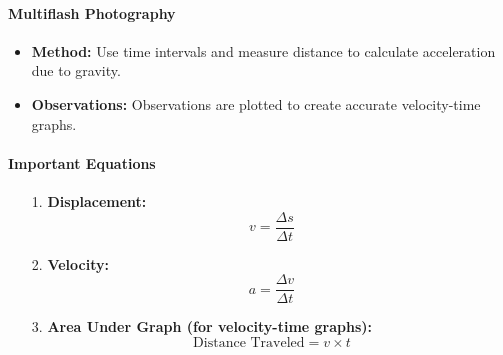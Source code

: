 \paragraph{Multiflash Photography}
\begin{itemize}
    \item \textbf{Method:} Use time intervals and measure distance to calculate acceleration due to gravity.
    \item \textbf{Observations:} Observations are plotted to create accurate velocity-time graphs.
\end{itemize}

\paragraph{Important Equations}
\begin{itemize}
    \item[1.] \textbf{Displacement:}
    \begin{equation}
        v = \frac{\Delta s}{\Delta t}
    \end{equation}
    \item[2.] \textbf{Velocity:}
    \begin{equation}
        a = \frac{\Delta v}{\Delta t}
    \end{equation}
    \item[3.] \textbf{Area Under Graph (for velocity-time graphs):}
    \begin{equation}
        \text{Distance Traveled} = v \times t
    \end{equation}
\end{itemize}